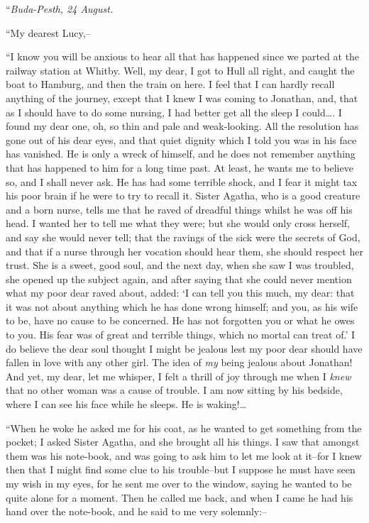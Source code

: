 \documentclass[12pt,openright]{book}
\begin{document}
“\textit{Buda-Pesth, 24 August.}

“My dearest Lucy,–

“I know you will be anxious to hear all that has happened since we parted at the railway station at Whitby. Well, my dear, I got to Hull all right, and caught the boat to Hamburg, and then the train on here. I feel that I can hardly recall anything of the journey, except that I knew I was coming to Jonathan, and, that as I should have to do some nursing, I had better get all the sleep I could…. I found my dear one, oh, so thin and pale and weak-looking. All the resolution has gone out of his dear eyes, and that quiet dignity which I told you was in his face has vanished. He is only a wreck of himself, and he does not remember anything that has happened to him for a long time past. At least, he wants me to believe so, and I shall never ask. He has had some terrible shock, and I fear it might tax his poor brain if he were to try to recall it. Sister Agatha, who is a good creature and a born nurse, tells me that he raved of dreadful things whilst he was off his head. I wanted her to tell me what they were; but she would only cross herself, and say she would never tell; that the ravings of the sick were the secrets of God, and that if a nurse through her vocation should hear them, she should respect her trust. She is a sweet, good soul, and the next day, when she saw I was troubled, she opened up the subject again, and after saying that she could never mention what my poor dear raved about, added: ‘I can tell you this much, my dear: that it was not about anything which he has done wrong himself; and you, as his wife to be, have no cause to be concerned. He has not forgotten you or what he owes to you. His fear was of great and terrible things, which no mortal can treat of.’ I do believe the dear soul thought I might be jealous lest my poor dear should have fallen in love with any other girl. The idea of \textit{my} being jealous about Jonathan! And yet, my dear, let me whisper, I felt a thrill of joy through me when I \textit{knew} that no other woman was a cause of trouble. I am now sitting by his bedside, where I can see his face while he sleeps. He is waking!…

“When he woke he asked me for his coat, as he wanted to get something from the pocket; I asked Sister Agatha, and she brought all his things. I saw that amongst them was his note-book, and was going to ask him to let me look at it–for I knew then that I might find some clue to his trouble–but I suppose he must have seen my wish in my eyes, for he sent me over to the window, saying he wanted to be quite alone for a moment. Then he called me back, and when I came he had his hand over the note-book, and he said to me very solemnly:–
\end{document}
